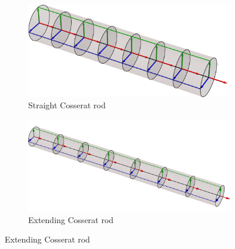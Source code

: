\begin{figure} 
    \centering
     
    \begin{subfigure}[b]{0.49\textwidth}  
        \centering 
        \includegraphics[width=\textwidth]{figs_part2/cosserat_kinematics/straight.png}
        \caption[Straight Cosserat rod]%
        {{\small Straight Cosserat rod}}    
        \label{fig:straight cosserat rod}
    \end{subfigure}
    \hfill
    \begin{subfigure}[b]{0.49\textwidth}
        \centering
        \includegraphics[width=\textwidth]{figs_part2/cosserat_kinematics/extend.png}
        \caption[Extending Cosserat rod]%
        {{\small Extending Cosserat rod}}    
        \label{fig:extending cosserat rod}
    \end{subfigure}    
    

\end{figure}

